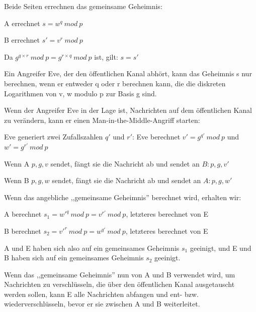\documentclass[a4paper]{article}
\begin{document}
\begin{multicols}{3}
\begin{itemize*}
\begin{itemize*}
                  \item Beide Seiten errechnen das gemeinsame Geheimnis:
                  \begin{itemize*} \item A errechnet $s=w^q\ mod\ p$ \item B errechnet $s'=v^r\ mod\ p$ \item Da $g^{q\times r}\ mod\ p = g^{r \times q}\ mod\ p$ ist, gilt: $s=s'$ \end{itemize*}
                  \item Ein Angreifer Eve, der den öffentlichen Kanal abhört, kann das Geheimnis s nur berechnen, wenn er entweder q oder r berechnen kann, die die diskreten Logarithmen von v, w modulo p zur Basis g sind.
            \end{itemize*}
            \item Wenn der Angreifer Eve in der Lage ist, Nachrichten auf dem
            öffentlichen Kanal zu verändern, kann er einen
            Man-in-the-Middle-Angriff starten:
            \begin{itemize*}
                  \item Eve generiert zwei Zufallszahlen $q'$ und $r'$: Eve berechnet $v'=g^{q'}\ mod\ p$ und $w'=g^{r'}\ mod\ p$
                  \item Wenn A ${p,g,v}$ sendet, fängt sie die Nachricht ab und sendet an $B:{p,g,v'}$
                  \item Wenn B ${p,g,w}$ sendet, fängt sie die Nachricht ab und sendet an $A:{p,g,w'}$
                  \item Wenn das angebliche ,,gemeinsame Geheimnis'' berechnet wird, erhalten wir:
                  \begin{itemize*} \item A berechnet $s_1=w'^q\ mod\ p = v^{r'}\ mod\ p$, letzteres berechnet von E \item B berechnet $s_2=v'^r\ mod\ p = w^{q'}\ mod\ p$, letzteres berechnet von E \item A und E haben sich also auf ein gemeinsames Geheimnis $s_1$ geeinigt, und E und B haben sich auf ein gemeinsames Geheimnis $s_2$ geeinigt. \end{itemize*}
                  \item Wenn das ,,gemeinsame Geheimnis'' nun von A und B verwendet wird, um Nachrichten zu verschlüsseln, die über den öffentlichen Kanal ausgetauscht werden sollen, kann E alle Nachrichten abfangen und ent- bzw. wiederverschlüsseln, bevor er sie zwischen A und B weiterleitet.

\end{itemize*}
\end{itemize*}
\end{multicols}
\end{document}
